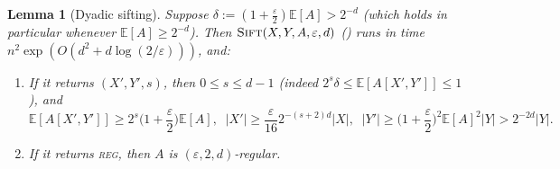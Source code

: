 \documentclass[11pt]{article}
\newtheorem{lemma}[theorem]{Lemma}
\theoremstyle{definition}
\renewcommand{\label}[1]{}%
\newcommand{\E}{\mathbb{E}}
\newcommand{\abs}[1]{\left\lvert #1 \right\rvert}
\newcommand{\dens}[1]{\E[#1]}
\newcommand{\Sift}{\textnormal{\textsc{Sift}}}
\newcommand{\tagreg}{\textnormal{\textsc{reg}}}
\begin{document}
\begin{lemma}[Dyadic sifting]
\label{lem:dyadic-sift}
Suppose $\delta := (1 + \frac{\varepsilon}{2})\dens{A} > 2^{-d}$ (which holds in particular whenever $\dens{A} \ge 2^{-d}$). Then $\Sift(X, Y, A, \varepsilon, d)$ () runs in time $n^2 \exp(O(d^2 + d\log(2/\varepsilon)))$, and:
\begin{enumerate}[leftmargin=*]
    \item If it returns $(X', Y', s)$, then $0 \le s \le d-1$ (indeed $2^s\delta \le \dens{A[X', Y']} \le 1$), and
    \begin{equation}\label{eq:dyadic-sift-guarantees}
        \dens{A[X', Y']} \ge 2^s\Big(1 + \frac{\varepsilon}{2}\Big)\dens{A}, \;\;
        \abs{X'} \ge \frac{\varepsilon}{16} 2^{-(s+2)d}\abs{X}, \;\;
        \abs{Y'} \ge \Big(1 + \frac{\varepsilon}{2}\Big)^2\dens{A}^2 \abs{Y} > 2^{-2d}\abs{Y}.
    \end{equation}
    \item If it returns \tagreg{}, then $A$ is $(\varepsilon, 2, d)$-regular.
\end{enumerate}
\end{lemma}
\end{document}
